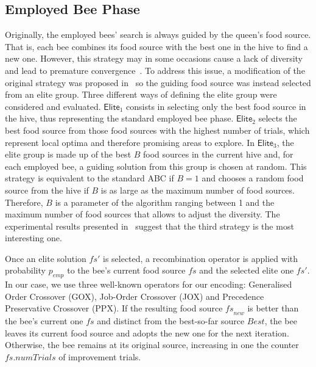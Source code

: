 \documentclass[icae]{iosart2x}
\newcommand{\reviewed}[1]{#1} %
\begin{document}
\subsection{Employed Bee Phase}
Originally, the employed bees' search is always guided by the queen's food source. \reviewed{That is, each bee combines its food source with the best one in the hive to find a new one.} However, this strategy may in some occasions cause a lack of diversity and lead to premature convergence~\cite{Banharnsakun2012}. To address this issue, a modification of the original strategy was proposed in~\cite{Diaz2022} so the guiding food source was instead selected from an elite group. Three different ways of defining the elite group were considered and evaluated. $\mathsf{Elite}_1$ consists in selecting only the best food source in the hive, thus representing the standard employed bee phase. $\mathsf{Elite}_2$ selects \reviewed{the best food source from those food sources with the highest number of trials}, which represent local optima and therefore promising areas to explore. In $\mathsf{Elite}_3$, the elite group is made up of the best $B$ food sources in the current hive and, for each employed bee, a guiding solution from this group is chosen at random. \reviewed{This strategy is equivalent to the standard ABC if $B=1$ and chooses a random food source from the hive if $B$ is as large as the maximum number of food sources. Therefore, $B$ is a parameter of the algorithm ranging between 1 and the maximum number of food sources that allows to adjust the diversity}. The experimental results presented in~\cite{Diaz2022} suggest that the third strategy is the most interesting one.

Once an elite solution $\mathit{fs}'$ is selected, a recombination operator is applied with probability $p_{emp}$ to the bee's current food source $\textit{fs}$ and the \reviewed{selected elite one $\mathit{fs}'$}. In our case, we use three well-known operators for our encoding: Generalised Order Crossover (GOX), Job-Order Crossover (JOX) and Precedence Preservative Crossover (PPX). If the resulting \reviewed{food source} $\mathit{fs}_{new}$ is better than the bee's current one \reviewed{$\textit{fs}$} and distinct from the \reviewed{best-so-far source ${Best}$}, the bee \reviewed{leaves its current food source and adopts the new one} for the next iteration. Otherwise, the bee remains at its original source, \reviewed{increasing in one the counter $\textit{fs.numTrials}$ of improvement trials}.
\end{document}

